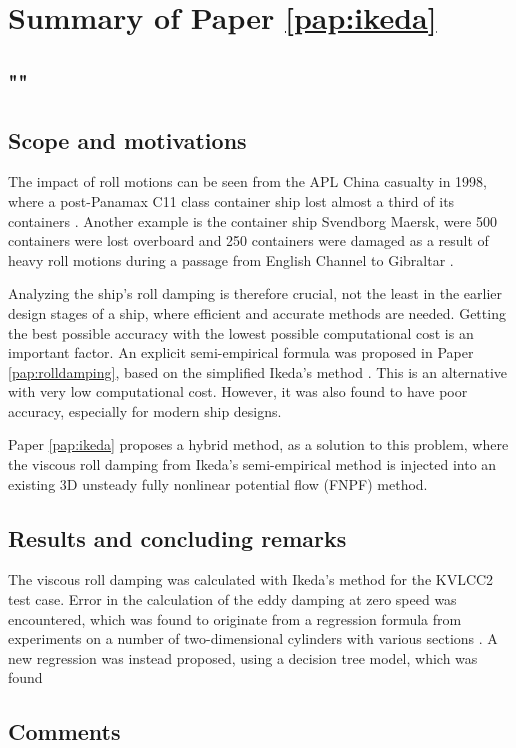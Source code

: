 \section{Summary of Paper \ref{pap:ikeda}}
\subsection*{""}
\subsection*{Scope and motivations}
The impact of roll motions can be seen from the APL China casualty in 1998, where a post-Panamax C11 class container ship lost almost a third of its containers \cite{france_investigation_2001}. Another example is the container ship Svendborg Maersk, were 500 containers were lost overboard and 250 containers were damaged as a result of heavy roll motions during a passage from English Channel to Gibraltar \cite{danish_maritime_accident_investigation_board_marine_2014}.

Analyzing the ship's roll damping is therefore crucial, not the least in the earlier design stages of a ship, where efficient and accurate methods are needed. 
Getting the best possible accuracy with the lowest possible computational cost is an important factor. An explicit semi-empirical formula was proposed in Paper \ref{pap:rolldamping}, based on the simplified Ikeda's method \cite{kawahara_simple_2011}. This is an alternative with very low computational cost. However, it was also found to have poor accuracy, especially for modern ship designs. 

Paper \ref{pap:ikeda} proposes a hybrid method, as a solution to this problem, where the viscous roll damping from Ikeda’s semi-empirical method is injected into an existing 3D unsteady fully nonlinear potential flow (FNPF) method.

\subsection*{Results and concluding remarks}
The viscous roll damping was calculated with Ikeda's method \cite{ikeda_components_1978} for the KVLCC2 test case. Error in the calculation of the eddy damping at zero speed was encountered, which was found to originate from a regression formula from experiments on a number of two-dimensional cylinders with various sections \cite{ikeda_eddy_1978}. A new regression was instead proposed, using a decision tree model, which was found 

\subsection*{Comments}
\clearpage